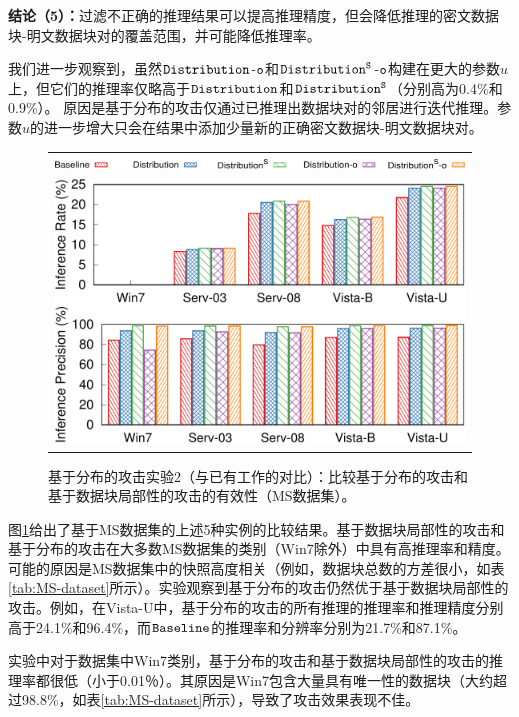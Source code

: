 \textbf{结论（5）：}过滤不正确的推理结果可以提高推理精度，但会降低推理的密文数据块-明文数据块对的覆盖范围，并可能降低推理率。

我们进一步观察到，虽然$\tt Distribution$-$\tt o$和$\tt Distribution^S$-$\tt o$构建在更大的参数$u$上，但它们的推理率仅略高于$\tt Distribution$和$\tt Distribution^S$（分别高为0.4\%和0.9\%）。 原因是基于分布的攻击仅通过已推理出数据块对的邻居进行迭代推理。参数$u$的进一步增大只会在结果中添加少量新的正确密文数据块-明文数据块对。

\begin{figure}[t]
    \centering
    \begin{tabular}{c}
        \includegraphics[width=.7\textwidth]{pic/legend-fsl-bar.pdf}\\
        \includegraphics[width=.7\textwidth]{pic/distribution-comparison-ms.pdf}\\
    \end{tabular}
    \caption{基于分布的攻击实验2（与已有工作的对比）：比较基于分布的攻击和基于数据块局部性的攻击的有效性（MS数据集）。}
    \label{fig:distribution-comparison-ms}
\end{figure}


图\ref{fig:distribution-comparison-ms}给出了基于MS数据集的上述5种实例的比较结果。基于数据块局部性的攻击和基于分布的攻击在大多数MS数据集的类别（Win7除外）中具有高推理率和精度。可能的原因是MS数据集中的快照高度相关（例如，数据块总数的方差很小，如表\ref{tab:MS-dataset}所示）。实验观察到基于分布的攻击仍然优于基于数据块局部性的攻击。例如，在Vista-U中，基于分布的攻击的所有推理的推理率和推理精度分别高于24.1\%和96.4\%，而$\tt Baseline$的推理率和分辨率分别为21.7\%和87.1\%。

实验中对于数据集中Win7类别，基于分布的攻击和基于数据块局部性的攻击的推理率都很低（小于0.01％）。其原因是Win7包含大量具有唯一性的数据块（大约超过98.8\%，如表\ref{tab:MS-dataset}所示），导致了攻击效果表现不佳。


